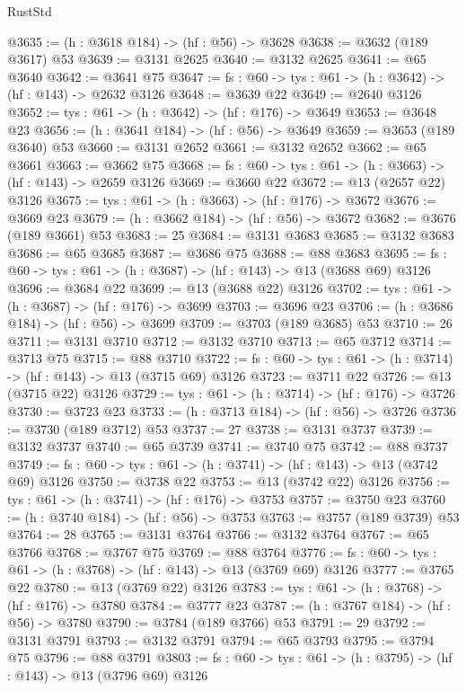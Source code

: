 \begin{lexlean}{RustStd}
\begin{coremodule}
@3635 := (h : @3618 @184) -> (hf : @56) -> @3628
@3638 := @3632 (@189 @3617) @53
@3639 := @3131 @2625
@3640 := @3132 @2625
@3641 := @65 @3640
@3642 := @3641 @75
@3647 := {fs : @60} -> {tys : @61} -> (h : @3642) -> (hf : @143) -> @2632 @3126
@3648 := @3639 @22
@3649 := @2640 @3126
@3652 := {tys : @61} -> (h : @3642) -> (hf : @176) -> @3649
@3653 := @3648 @23
@3656 := (h : @3641 @184) -> (hf : @56) -> @3649
@3659 := @3653 (@189 @3640) @53
@3660 := @3131 @2652
@3661 := @3132 @2652
@3662 := @65 @3661
@3663 := @3662 @75
@3668 := {fs : @60} -> {tys : @61} -> (h : @3663) -> (hf : @143) -> @2659 @3126
@3669 := @3660 @22
@3672 := @13 (@2657 @22) @3126
@3675 := {tys : @61} -> (h : @3663) -> (hf : @176) -> @3672
@3676 := @3669 @23
@3679 := (h : @3662 @184) -> (hf : @56) -> @3672
@3682 := @3676 (@189 @3661) @53
@3683 := 25
@3684 := @3131 @3683
@3685 := @3132 @3683
@3686 := @65 @3685
@3687 := @3686 @75
@3688 := @88 @3683
@3695 := {fs : @60} -> {tys : @61} -> (h : @3687) -> (hf : @143) -> @13 (@3688 @69) @3126
@3696 := @3684 @22
@3699 := @13 (@3688 @22) @3126
@3702 := {tys : @61} -> (h : @3687) -> (hf : @176) -> @3699
@3703 := @3696 @23
@3706 := (h : @3686 @184) -> (hf : @56) -> @3699
@3709 := @3703 (@189 @3685) @53
@3710 := 26
@3711 := @3131 @3710
@3712 := @3132 @3710
@3713 := @65 @3712
@3714 := @3713 @75
@3715 := @88 @3710
@3722 := {fs : @60} -> {tys : @61} -> (h : @3714) -> (hf : @143) -> @13 (@3715 @69) @3126
@3723 := @3711 @22
@3726 := @13 (@3715 @22) @3126
@3729 := {tys : @61} -> (h : @3714) -> (hf : @176) -> @3726
@3730 := @3723 @23
@3733 := (h : @3713 @184) -> (hf : @56) -> @3726
@3736 := @3730 (@189 @3712) @53
@3737 := 27
@3738 := @3131 @3737
@3739 := @3132 @3737
@3740 := @65 @3739
@3741 := @3740 @75
@3742 := @88 @3737
@3749 := {fs : @60} -> {tys : @61} -> (h : @3741) -> (hf : @143) -> @13 (@3742 @69) @3126
@3750 := @3738 @22
@3753 := @13 (@3742 @22) @3126
@3756 := {tys : @61} -> (h : @3741) -> (hf : @176) -> @3753
@3757 := @3750 @23
@3760 := (h : @3740 @184) -> (hf : @56) -> @3753
@3763 := @3757 (@189 @3739) @53
@3764 := 28
@3765 := @3131 @3764
@3766 := @3132 @3764
@3767 := @65 @3766
@3768 := @3767 @75
@3769 := @88 @3764
@3776 := {fs : @60} -> {tys : @61} -> (h : @3768) -> (hf : @143) -> @13 (@3769 @69) @3126
@3777 := @3765 @22
@3780 := @13 (@3769 @22) @3126
@3783 := {tys : @61} -> (h : @3768) -> (hf : @176) -> @3780
@3784 := @3777 @23
@3787 := (h : @3767 @184) -> (hf : @56) -> @3780
@3790 := @3784 (@189 @3766) @53
@3791 := 29
@3792 := @3131 @3791
@3793 := @3132 @3791
@3794 := @65 @3793
@3795 := @3794 @75
@3796 := @88 @3791
@3803 := {fs : @60} -> {tys : @61} -> (h : @3795) -> (hf : @143) -> @13 (@3796 @69) @3126

\end{coremodule}
\end{lexlean}
